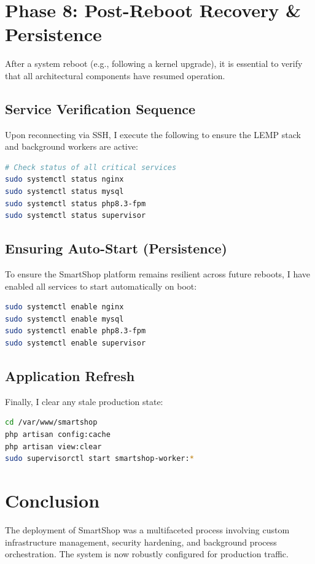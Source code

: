 \documentclass[12pt,a4paper]{article}
\begin{document}
\newpage

\section{Phase 8: Post-Reboot Recovery \& Persistence}
After a system reboot (e.g., following a kernel upgrade), it is essential to verify that all architectural components have resumed operation.

\subsection{Service Verification Sequence}
Upon reconnecting via SSH, I execute the following to ensure the LEMP stack and background workers are active:

\begin{lstlisting}[language=bash]
# Check status of all critical services
sudo systemctl status nginx
sudo systemctl status mysql
sudo systemctl status php8.3-fpm
sudo systemctl status supervisor
\end{lstlisting}

\subsection{Ensuring Auto-Start (Persistence)}
To ensure the SmartShop platform remains resilient across future reboots, I have enabled all services to start automatically on boot:

\begin{lstlisting}[language=bash]
sudo systemctl enable nginx
sudo systemctl enable mysql
sudo systemctl enable php8.3-fpm
sudo systemctl enable supervisor
\end{lstlisting}

\subsection{Application Refresh}
Finally, I clear any stale production state:
\begin{lstlisting}[language=bash]
cd /var/www/smartshop
php artisan config:cache
php artisan view:clear
sudo supervisorctl start smartshop-worker:*
\end{lstlisting}

\section{Conclusion}
The deployment of SmartShop was a multifaceted process involving custom infrastructure management, security hardening, and background process orchestration. The system is now robustly configured for production traffic.
\end{document}
